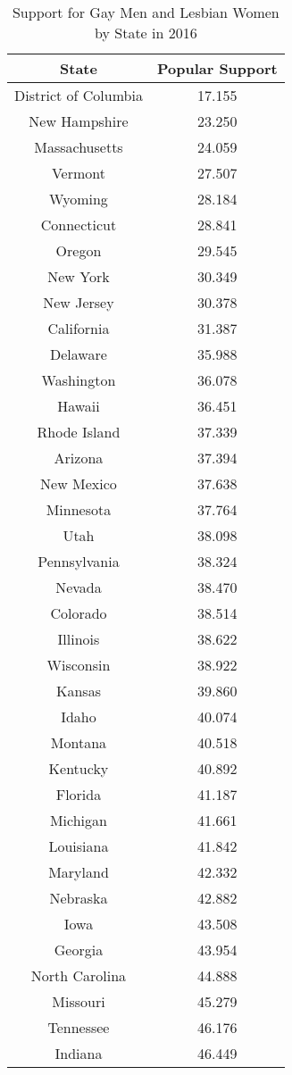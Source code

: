 \begin{spacing}{1}
\begin{longtable}{|c|c|} %
\caption{Support for Gay Men and Lesbian Women by State in 2016}
\label{tab: pop_support} 
\hline
\textbf{State} & \textbf{Popular Support} \\
\hline
District of Columbia & 17.155\\
New Hampshire & 23.250\\
Massachusetts & 24.059\\
Vermont & 27.507\\
Wyoming & 28.184\\
Connecticut & 28.841\\
Oregon & 29.545\\
New York & 30.349\\
New Jersey & 30.378\\
California & 31.387\\
Delaware & 35.988\\
Washington & 36.078\\
Hawaii & 36.451\\
Rhode Island & 37.339\\
Arizona & 37.394\\
New Mexico & 37.638\\
Minnesota & 37.764\\
Utah & 38.098\\
Pennsylvania & 38.324\\
Nevada & 38.470\\
Colorado & 38.514\\
Illinois & 38.622\\
Wisconsin & 38.922\\
Kansas & 39.860\\
Idaho & 40.074\\
Montana & 40.518\\
Kentucky & 40.892\\
Florida & 41.187\\
Michigan & 41.661\\
Louisiana & 41.842\\
Maryland & 42.332\\
Nebraska & 42.882\\
Iowa & 43.508\\
Georgia & 43.954\\
North Carolina & 44.888\\
Missouri & 45.279\\
Tennessee & 46.176\\
Indiana & 46.449\\

\end{longtable}
\end{spacing}
